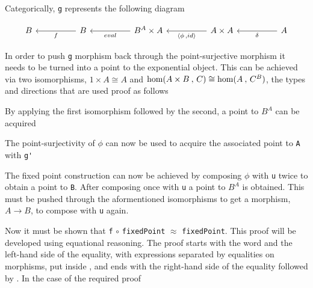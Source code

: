 
Categorically, \verb|g| represents the following diagram

\[\begin{tikzcd}[sep=huge]
    B & B \arrow[l, "f"] & B^A \times A \arrow[l, "eval"] & A \times A \arrow[l,
    "{\langle \phi \, , id\rangle}"] & A \arrow[l, "\delta"]
\end{tikzcd}\]

In order to push \verb|g| morphism back through the point-surjective morphism
it needs to be turned into a point to the exponential object. This can be
achieved via two isomorphisms, $1 \times A \cong A$ and $\textnormal{hom}(A \times B \: , \, C)
\cong \textnormal{hom}(A \: , \, C^B)$, the types and directions that are used proof as
follows

\begin{AgdaMultiCode}
\end{AgdaMultiCode}

By applying the first isomorphism followed by the second, a point to $B^A$ can
be acquired
\begin{AgdaAlign}

The point-surjectivity of $\phi$ can now be used to acquire the associated point
to \verb|A| with \verb|g'|

\end{AgdaAlign}

The fixed point construction can now be achieved by composing $\phi$ with
\verb|u| twice to obtain a point to \verb|B|. After composing once with \verb|u|
a point to $B^A$ is obtained. This must be pushed through the aformentioned
isomorphisms to get a morphism, $A \rightarrow B$, to compose with \verb|u|
again.


Now it must be shown that \verb|f| $\circ$ \verb|fixedPoint| $\approx$
\verb|fixedPoint|. This proof will be developed using equational reasoning. The
proof starts with the word  and the left-hand side of the
equality, with expressions separated by
equalities on morphisms, put inside
\AgdaSpace{}, and
ends with the right-hand side of the equality followed by
. In the case of the required proof

